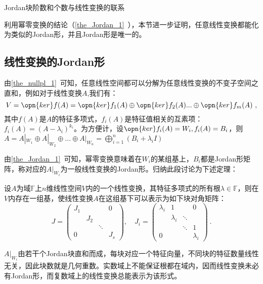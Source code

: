 

\begin{issues}
\issueDraft
\issueTODO Jordan块阶数和个数与线性变换的联系
\end{issues}
利用幂零变换的结论（\autoref{the_Jordan_1}~），本节进一步证明，任意线性变换都能化为类似的Jordan形，并且Jordan形是唯一的。
\subsection{线性变换的Jordan形}
由\autoref{the_nullpl_1}~可知，任意线性空间都可以分解为任意线性变换的不变子空间之直和，例如对于线性变换$A$,我们有：
\begin{equation}
V=\opn{ker}f(A)=\opn{ker}f_1(A)\oplus\opn{ker}f_2(A)...\oplus\opn{ker}f_m(A)~,
\end{equation}
其中$f(A)$是$A$的特征多项式，$f_i(A)$是特征值相关的互素项：$f_i(A)=(A-\lambda_i)^{k_i}$。为方便计，设$\opn{ker}f_i(A)=W_i,f_i(A)=B_i$，则$A=A|_{W_1}\oplus A|_{W_2}\oplus...\oplus A|_{W_n}=\bigoplus^n_{i=1}(B_i+\lambda_iI)$

由\autoref{the_Jordan_1}~可知，幂零变换意味着在$W_i$的某组基上，$B_i$都是Jordan形矩阵，称对应的$A|_{W_i}$为一般线性变换的Jordan形。归纳此段讨论为下述定理：
\begin{theorem}{}\label{the_ltrJor_1}
设$A$为域$\mathbb F$上$n$维线性空间$V$内的一个线性变换，其特征多项式的所有根$\lambda\in\mathbb F$，则在$V$内存在一组基，使线性变换$A$在这组基下可以表示为如下块对角矩阵：
\begin{equation}
J=\left(\begin{array}{cccc}
J_1 & & & 0 \\
& J_2 & & \\
& & \ddots & \\
0 & & & J_s
\end{array}\right), \quad J_i=\left(\begin{array}{cccc}
\lambda_i & 1 & & 0 \\
& \lambda_i & \ddots & \\
& & \ddots & 1 \\
0 & & & \lambda_i
\end{array}\right)~.
\end{equation}
\end{theorem}
$A|_{W_i}$由若干个Jordan块直和而成，每块对应一个特征向量，不同块的特征数量线性无关，因此块数就是几何重数。实数域上不能保证根都在域内，因而线性变换未必有Jordan形，而复数域上的线性变换总能表示为该形式。
